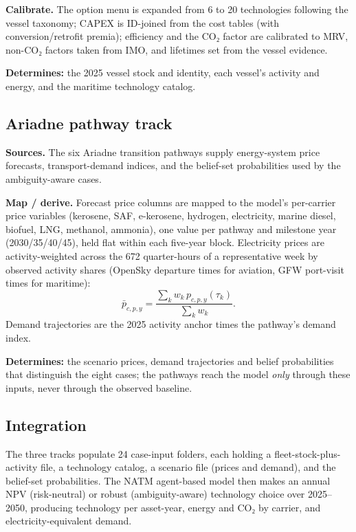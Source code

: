 \documentclass[11pt,a4paper]{article}
\begin{document}
\textbf{Calibrate.} The option menu is expanded from 6 to 20 technologies following the vessel taxonomy; CAPEX is ID-joined from the cost tables (with conversion/retrofit premia); efficiency and the CO₂ factor are calibrated to MRV, non-CO₂ factors taken from IMO, and lifetimes set from the vessel evidence.

\textbf{Determines:} the 2025 vessel stock and identity, each vessel's activity and energy, and the maritime technology catalog.

\subsection*{Ariadne pathway track}

\textbf{Sources.} The six Ariadne transition pathways supply energy-system price forecasts, transport-demand indices, and the belief-set probabilities used by the ambiguity-aware cases.

\textbf{Map / derive.} Forecast price columns are mapped to the model's per-carrier price variables (kerosene, SAF, e-kerosene, hydrogen, electricity, marine diesel, biofuel, LNG, methanol, ammonia), one value per pathway and milestone year (2030/35/40/45), held flat within each five-year block. Electricity prices are activity-weighted across the 672 quarter-hours of a representative week by observed activity shares (OpenSky departure times for aviation, GFW port-visit times for maritime):
\[
\bar{p}_{c,p,y}=\frac{\sum_k w_k\,p_{c,p,y}(\tau_k)}{\sum_k w_k}.
\]
Demand trajectories are the 2025 activity anchor times the pathway's demand index.

\textbf{Determines:} the scenario prices, demand trajectories and belief probabilities that distinguish the eight cases; the pathways reach the model \emph{only} through these inputs, never through the observed baseline.

\subsection*{Integration}

The three tracks populate 24 case-input folders, each holding a fleet-stock-plus-activity file, a technology catalog, a scenario file (prices and demand), and the belief-set probabilities. The NATM agent-based model then makes an annual NPV (risk-neutral) or robust (ambiguity-aware) technology choice over 2025--2050, producing technology per asset-year, energy and CO₂ by carrier, and electricity-equivalent demand.
\end{document}
